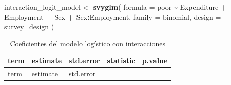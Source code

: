 \documentclass[
  spanish,
  12pt,
]{book}
\newenvironment{Shaded}{\begin{snugshade}}{\end{snugshade}}
\newcommand{\AttributeTok}[1]{\textcolor[rgb]{0.13,0.29,0.53}{#1}}
\newcommand{\FunctionTok}[1]{\textcolor[rgb]{0.13,0.29,0.53}{\textbf{#1}}}
\newcommand{\NormalTok}[1]{#1}
\newcommand{\OtherTok}[1]{\textcolor[rgb]{0.56,0.35,0.01}{#1}}
\newcommand{\SpecialCharTok}[1]{\textcolor[rgb]{0.81,0.36,0.00}{\textbf{#1}}}
\begin{document}
\begin{Shaded}
\begin{Highlighting}[]
\NormalTok{interaction\_logit\_model }\OtherTok{\textless{}{-}} \FunctionTok{svyglm}\NormalTok{(}
  \AttributeTok{formula =}\NormalTok{ poor }\SpecialCharTok{\textasciitilde{}}\NormalTok{ Expenditure }\SpecialCharTok{+}\NormalTok{ Employment }\SpecialCharTok{+}\NormalTok{ Sex }\SpecialCharTok{+}\NormalTok{ Sex}\SpecialCharTok{:}\NormalTok{Employment,}
  \AttributeTok{family =}\NormalTok{ binomial,}
  \AttributeTok{design =}\NormalTok{ survey\_design}
\NormalTok{)}
\end{Highlighting}
\end{Shaded}

\begin{longtable}[]{@{}
  >{\raggedright\arraybackslash}p{}
  >{\centering\arraybackslash}p{}
  >{\centering\arraybackslash}p{}
  >{\centering\arraybackslash}p{}
  >{\centering\arraybackslash}p{}@{}}
\caption{\label{tab:tab-logistica-interaccion}Coeficientes del modelo logístico con interacciones}\tabularnewline
\toprule\noalign{}
\begin{minipage}[b]{\linewidth}\raggedright
term
\end{minipage} & \begin{minipage}[b]{\linewidth}\centering
estimate
\end{minipage} & \begin{minipage}[b]{\linewidth}\centering
std.error
\end{minipage} & \begin{minipage}[b]{\linewidth}\centering
statistic
\end{minipage} & \begin{minipage}[b]{\linewidth}\centering
p.value
\end{minipage} \\
\midrule\noalign{}
\endfirsthead
\toprule\noalign{}
\begin{minipage}[b]{\linewidth}\raggedright
term
\end{minipage} & \begin{minipage}[b]{\linewidth}\centering
estimate
\end{minipage} & \begin{minipage}[b]{\linewidth}\centering
std.error
\end{minipage} & \begin{minipage}[b]{\linewidth}\centering

\end{minipage}
\end{longtable}
\end{document}
